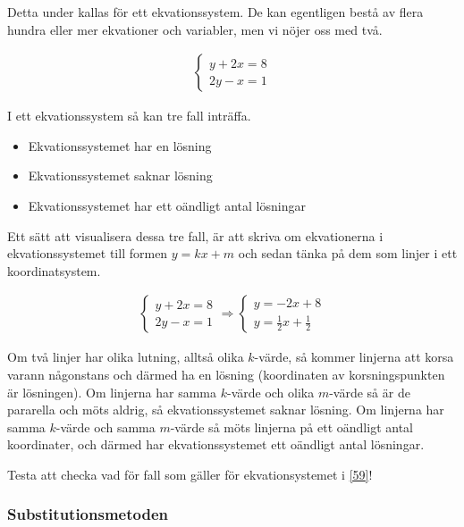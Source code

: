 Detta under kallas för ett ekvationssystem. De kan egentligen bestå av flera hundra eller mer ekvationer och variabler, men vi nöjer oss med två.

\begin{align}
	\label{59}
	\begin{cases}
		y+2x=8 \\
		2y-x = 1
	\end{cases}
\end{align}

I ett ekvationssystem så kan tre fall inträffa. 

\begin{itemize}
	\item Ekvationssystemet har en lösning
	\item Ekvationssystemet saknar lösning
	\item Ekvationssystemet har ett oändligt antal lösningar
\end{itemize}

Ett sätt att visualisera dessa tre fall, är att skriva om ekvationerna i ekvationssystemet till formen $y=kx+m$ och sedan tänka på dem som linjer i ett koordinatsystem.

\begin{align}
	\begin{cases}
		y+2x=8 \\
		2y-x = 1
	\end{cases} \Rightarrow 
	\begin{cases}
		y=-2x+8 \\
		y = \frac{1}{2}x+\frac{1}{2}
	\end{cases}
\end{align}

Om två linjer har olika lutning, alltså olika $k$-värde, så kommer linjerna att korsa varann någonstans och därmed ha en lösning (koordinaten av korsningspunkten är lösningen). Om linjerna har samma $k$-värde och olika $m$-värde så är de pararella och möts aldrig, så ekvationssystemet saknar lösning. Om linjerna har samma $k$-värde och samma $m$-värde så möts linjerna på ett oändligt antal koordinater, och därmed har ekvationssystemet ett oändligt antal lösningar. 

Testa att checka vad för fall som gäller för ekvationsystemet i \eqref{59}!

\subsubsection{Substitutionsmetoden}
\label{Substitutionsmetoden}

